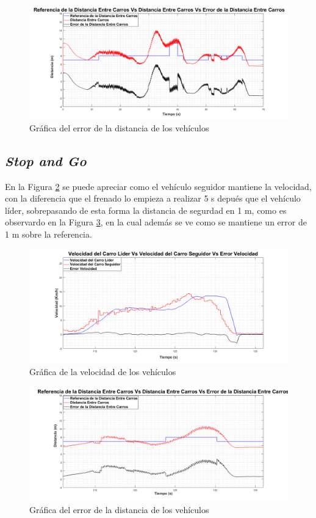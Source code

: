 \begin{figure}[H]
	\centering
		\includegraphics[scale=0.35]{Imagenes/distrea}
		\caption{Gráfica del error de la distancia de los vehículos}
		\label{fig:distrea}
\end{figure}	


\subsection{\textit{Stop and Go}}
En la Figura \ref{fig:velreastg} se puede apreciar como el vehículo seguidor mantiene la velocidad, con la diferencia que el frenado lo empieza a realizar 5 s depués que el vehículo líder, sobrepasando de esta forma la distancia de segurdad en 1 m, como es observardo en la Figura \ref{fig:distreastg}, en la cual además se ve como se mantiene un error de 1 m sobre la referencia.\\ 
\begin{figure}[H]
	\centering
		\includegraphics[scale=0.35]{Imagenes/velreastg}
		\caption{Gráfica de la velocidad de los vehículos}
		\label{fig:velreastg}
\end{figure}	

\begin{figure}[H]
	\centering
		\includegraphics[scale=0.35]{Imagenes/distreastg}
		\caption{Gráfica del error de la distancia de los vehículos}
		\label{fig:distreastg}
\end{figure}	


